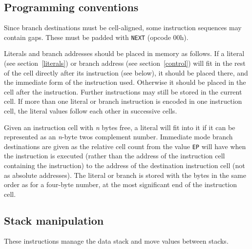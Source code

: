 \documentclass{article}
\newlength{\opcode}\opcode=0.5in
\begin{document}
\subsection{Programming conventions}
\label{conventions}

Since branch destinations must be cell-aligned, some instruction sequences may
contain gaps. These must be padded with {\tt NEXT} (opcode 00h).

Literals and branch addresses should be placed in memory as follows. If a
literal (see section~\ref{literals}) or branch address (see section~\ref{control})
will fit in the rest of the cell directly after its instruction
(see below), it should be placed there, and the immediate form of the
instruction used. Otherwise it should be placed in the cell after the
instruction. Further instructions may still be stored in the current cell. If
more than one literal or branch instruction is encoded in one instruction cell,
the literal values follow each other in successive cells.

Given an instruction cell with \textit{n} bytes free, a literal will fit into
it if it can be represented as an \textit{n}-byte twos complement number.
Immediate mode branch destinations are given as the relative cell count from
the value {\tt EP} will have when the instruction is executed (rather than the
address of the instruction cell containing the instruction) to the address of
the destination instruction cell (not as absolute addresses). The literal or
branch is stored with the bytes in the same order as for a four-byte number, at
the most significant end of the instruction cell.


\subsection{Stack manipulation}
\label{stackinst}

These instructions manage the data stack and move values between stacks.
\end{document}
